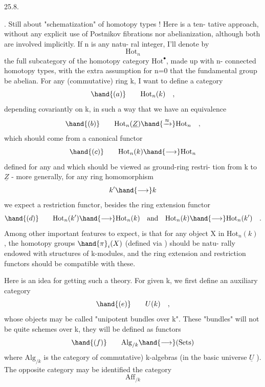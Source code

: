 
25.8.

. Still about "schematization" of homotopy types ! Here is a ten-%
tative approach,  without any explicit use of Postnikov fibrations nor
abelianization,  although both are involved implicitly.  If n is any natu-%
ral integer,  I'll denote by
\[ \mathrm{Hot}_n \]
the full subcategory of the  homotopy category  $\mathrm{Hot}^{\bullet}$,  made up with n-%
connected homotopy types,  with the extra assumption for n=0 that the
fundamental group be abelian.  For any (commutative) ring k,  I want to
define a category
\[ \hand{(a)} \qquad \mathrm{Hot}_n(k) \quad , \]
depending covariantly on k,  in such a way that we have an equivalence
\[ \hand{(b)} \qquad \mathrm{Hot}_n(\underline{Z}) \hand{\xrightarrow{\approx}} \mathrm{Hot}_n \quad , \]
which should come from a canonical functor
\[ \hand{(c)} \qquad \mathrm{Hot}_n(k) \hand{\longrightarrow} \mathrm{Hot}_n \]
defined  for any and which should be viewed as ground-ring restri-%
tion from k to $\underline{Z}$  -  more generally,  for any ring homomorphism
\[ k' \hand{\longrightarrow} k \]
we expect a restriction functor,  besides the ring extension functor
\[ \hand{(d)} \qquad \mathrm{Hot}_n(k') \hand{\longrightarrow} \mathrm{Hot}_n(k) \quad \text{and} \quad \mathrm{Hot}_n(k) \hand{\longrightarrow} \mathrm{Hot}_n(k') \quad . \]
Among other important features to expect,  is that for any object X in
$\mathrm{Hot}_n(k)$ ,  the homotopy groups $\hand{\pi}_i(X)$  (defined via ) should be natu-%
rally endowed with structures of k-modules,  and the ring extension and
restriction functors should be compatible with these.

Here is an idea for getting such a theory.  For given k,  we first
define an auxiliary category
\[ \hand{(e)} \qquad U(k) \quad , \]
whose objects may be called "unipotent bundles over k".  
These "bundles" will not be quite schemes over k,  they will be defined
as functors
\[ \hand{(f)} \qquad \mathrm{Alg}_{/k} \hand{\longrightarrow} (\mathrm{Sets}) \]
where $\mathrm{Alg}_{/k}$  is the category of \hand{(}commutative) k-algebras (in the basic
universe $\underline{U}$ ).  The opposite category may be identified  the category
\[ \mathrm{Aff}_{/k} \]


